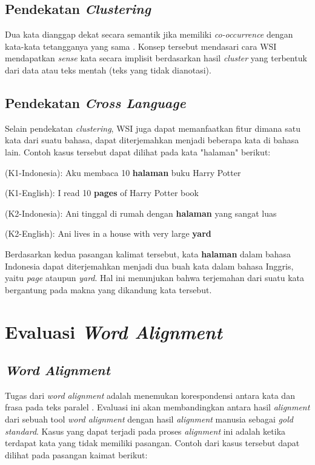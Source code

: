 	\subsection{Pendekatan \textit{Clustering}}
	Dua kata dianggap dekat secara semantik jika memiliki \textit{co-occurrence} dengan kata-kata tetangganya yang sama \citep{nasiruddin2013state}. Konsep tersebut mendasari cara WSI mendapatkan \textit{sense} kata secara implisit berdasarkan hasil \textit{cluster} yang terbentuk dari data atau teks mentah (teks yang tidak dianotasi). 
	
	\subsection{Pendekatan \textit{Cross Language}}
	Selain pendekatan \textit{clustering}, WSI juga dapat memanfaatkan fitur dimana satu kata dari suatu bahasa, dapat diterjemahkan menjadi beberapa kata di bahasa lain. Contoh kasus tersebut dapat dilihat pada kata "halaman" berikut:



	(K1-Indonesia): Aku membaca 10 \textbf{halaman} buku Harry Potter
	
	(K1-English): I read 10 \textbf{pages} of Harry Potter book
	
	(K2-Indonesia): Ani tinggal di rumah dengan \textbf{halaman} yang sangat luas
	
	(K2-English): Ani lives in a house with very large \textbf{yard}
	
	
	
	Berdasarkan kedua pasangan kalimat tersebut, kata \textbf{halaman} dalam bahasa Indonesia dapat diterjemahkan menjadi dua buah kata dalam bahasa Inggris, yaitu \textit{page} ataupun \textit{yard}. Hal ini menunjukan bahwa terjemahan dari suatu kata bergantung pada makna yang dikandung kata tersebut.

\section{Evaluasi \textit{Word Alignment}}

\subsection{\textit{Word Alignment}}
Tugas dari \textit{word alignment} adalah menemukan korespondensi antara kata dan frasa pada teks paralel 
\citep{mihalcea2003evaluation}. Evaluasi ini akan membandingkan antara hasil \textit{alignment} dari sebuah tool \textit{word alignment} dengan hasil \textit{alignment} manusia sebagai \textit{gold standard}. Kasus yang dapat terjadi pada proses \textit{alignment} ini adalah ketika terdapat kata yang tidak memiliki pasangan. Contoh dari kasus tersebut dapat dilihat pada pasangan kaimat berikut:


